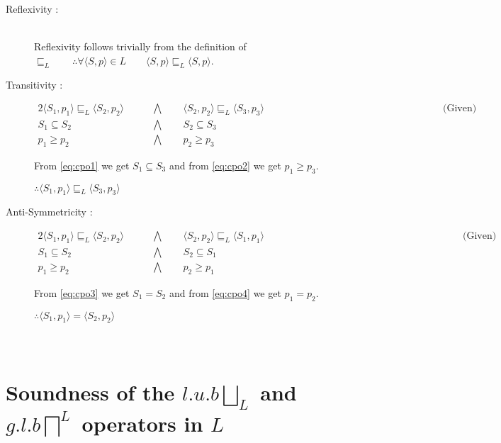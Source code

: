 \documentclass[final,3p, review, times]{util/elsarticle}
\begin{document}
\begin{description}
\item[Reflexivity :] \hfill \\
	Reflexivity follows trivially from the definition of $\sqsubseteq_L\qquad\therefore\forall \langle S,p\rangle\in L\qquad\langle S,p\rangle\sqsubseteq_L\langle S,p\rangle$.
\item[Transitivity :] \hfill
\begin{alignat}{2}
    \langle S_1,p_1\rangle\sqsubseteq_L\langle S_2,p_2\rangle &\qquad\bigwedge\qquad \langle S_2,p_2\rangle\sqsubseteq_L\langle S_3,p_3\rangle\qquad\qquad\qquad\qquad\qquad\qquad\qquad\qquad\qquad\text{(Given)}\nonumber\\
    S_1\subseteq S_2 &\qquad\bigwedge\qquad S_2\subseteq S_3\label{eq:cpo1}\\
    p_1\geq p_2 &\qquad\bigwedge\qquad p_2\geq p_3\label{eq:cpo2}
\end{alignat}

From \ref{eq:cpo1} we get $S_1\subseteq S_3$ and from \ref{eq:cpo2} we get
$p_1\geq p_3$.
	
	$\therefore \langle S_1,p_1\rangle\sqsubseteq_L\langle S_3,p_3\rangle$
\item[Anti-Symmetricity :] \hfill
\begin{alignat}{2}
    \langle S_1,p_1\rangle\sqsubseteq_L\langle S_2,p_2\rangle &\qquad\bigwedge\qquad \langle S_2,p_2\rangle\sqsubseteq_L\langle S_1,p_1\rangle\qquad\qquad\qquad\qquad\qquad\qquad\qquad\qquad\qquad\qquad\text{(Given)}\nonumber\\
    S_1\subseteq S_2 &\qquad\bigwedge\qquad S_2\subseteq S_1\label{eq:cpo3}\\
    p_1\geq p_2 &\qquad\bigwedge\qquad p_2\geq p_1\label{eq:cpo4}
\end{alignat}

From \ref{eq:cpo3} we get $S_1=S_2$ and from \ref{eq:cpo4} we get $p_1=p_2$.
	
	$\therefore \langle S_1,p_1\rangle=\langle S_2,p_2\rangle$
\end{description}









\section{\\Soundness of the $l.u.b \displaystyle\bigsqcup_L$ and $g.l.b \displaystyle\bigsqcap^L$ operators in $L$}
\label{app:concrete_ub}
\end{document}
